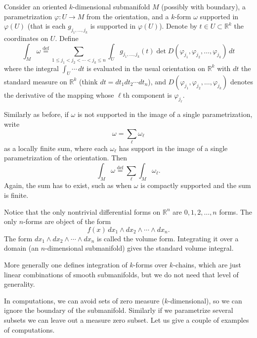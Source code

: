 \documentclass[12pt,openany]{book}
\newcommand{\R}{{\mathbb{R}}}
\theoremstyle{plain}
\theoremstyle{remark}
\theoremstyle{definition}
\theoremstyle{exercise}
\theoremstyle{example}
\begin{document}
Consider
an oriented $k$-dimensional submanifold $M$
(possibly with boundary), a parametrization $\varphi \colon U \to M$
from the orientation,
and a $k$-form $\omega$
supported in $\varphi(U)$ (that is each $g_{j_1,\ldots,j_k}$ is supported in
$\varphi(U)$).
Denote by $t \in U \subset \R^k$
the coordinates on $U$.  Define
\begin{equation*}
\int_M \omega
\overset{\text{def}}{=}
\sum_{1 \leq j_1 < j_2 < \cdots < j_k \leq n}
\int_U
g_{j_1,\ldots,j_k}(t)
\det D (\varphi_{j_1},\varphi_{j_2},\ldots,\varphi_{j_k})
\,
dt
\end{equation*}
where the integral $\int_U \cdots\, dt$ is evaluated in the
usual orientation on $\R^k$ with $dt$ the standard
measure on $\R^k$ (think $dt = dt_1 dt_2 \cdots dt_n$), and
$D (\varphi_{j_1},\varphi_{j_2},\ldots,\varphi_{j_k})$
denotes the derivative of the mapping whose $\ell$th component
is $\varphi_{j_\ell}$.

Similarly as before, if $\omega$ is not supported in the
image of a single parametrization, write
\begin{equation*}
\omega = \sum_{\ell} \omega_\ell 
\end{equation*}
as a locally finite sum,
where each $\omega_\ell$ has support in the image of a single
parametrization of the orientation.
Then
\begin{equation*}
\int_M \omega
\overset{\text{def}}{=}
\sum_{\ell}
\int_M \omega_\ell .
\end{equation*}
Again, the sum has to exist, such as when $\omega$ is compactly supported
and the sum is finite.

Notice that the only nontrivial differential forms on $\R^n$
are $0,1,2,\ldots,n$ forms.  The only $n$-forms are
object of the form
\begin{equation*}
f(x) \,
dx_1 \wedge dx_2 \wedge \cdots \wedge dx_n .
\end{equation*}
The form $dx_1 \wedge dx_2 \wedge \cdots \wedge dx_n$ is called the
volume form.  Integrating it over a domain (an $n$-dimensional submanifold)
gives the standard volume integral.

More generally one defines integration of $k$-forms over $k$-chains,
which are just linear combinations of smooth submanifolds, but we do not
need that level of generality.

\medskip

In computations, we can avoid sets of zero measure ($k$-dimensional),
so we can ignore the boundary of the submanifold.  Similarly if we parametrize
several subsets we can leave out a measure zero subset.
Let us give a couple of examples of computations.
\end{document}
